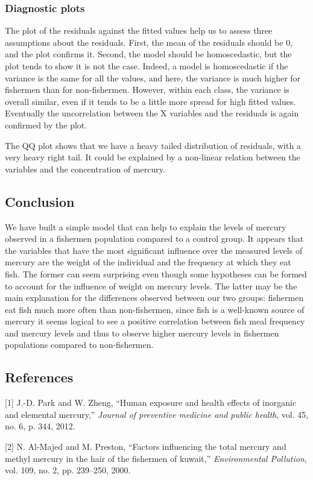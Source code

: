 \documentclass[12pt,]{article}
\begin{document}
\subsubsection{Diagnostic plots}\label{diagnostic-plots}

The plot of the residuals against the fitted values help us to assess three assumptions about the residuals. First, the mean of the residuals should be 0, and the plot confirms it. Second, the model should be homoscedastic, but the plot tends to show it is not the case. Indeed, a model is homoscedastic if the variance is the same for all the values, and here, the variance is much higher for fishermen than for non-fishermen. However, within each class, the variance is overall similar, even if it tends to be a little more spread for high fitted values. Eventually the uncorrelation between the X variables and the residuals is again confirmed by the plot.

The QQ plot shows that we have a heavy tailed distribution of residuals,
with a very heavy right tail. It could be explained by a non-linear
relation between the variables and the concentration of mercury.

\subsection{Conclusion}\label{conclusion}

We have built a simple model that can help to explain the levels of
mercury observed in a fishermen population compared to a control group.
It appears that the variables that have the most significant influence
over the measured levels of mercury are the weight of the individual and
the frequency at which they eat fish. The former can seem surprising
even though some hypotheses can be formed to account for the influence
of weight on mercury levels. The latter may be the main explanation for
the differences observed between our two groups: fishermen eat fish much
more often than non-fishermen, since fish is a well-known source of
mercury it seems logical to see a positive correlation between fish meal
frequency and mercury levels and thus to observe higher mercury levels
in fishermen populations compared to non-fishermen.

\subsection*{References}\label{references}

\hypertarget{refs}{}
\hypertarget{ref-park2012human}{}
{[}1{]} J.-D. Park and W. Zheng, ``Human exposure and health effects of
inorganic and elemental mercury,'' \emph{Journal of preventive medicine
and public health}, vol. 45, no. 6, p. 344, 2012.

\hypertarget{ref-al2000factors}{}
{[}2{]} N. Al-Majed and M. Preston, ``Factors influencing the total
mercury and methyl mercury in the hair of the fishermen of kuwait,''
\emph{Environmental Pollution}, vol. 109, no. 2, pp. 239--250, 2000.
\end{document}
